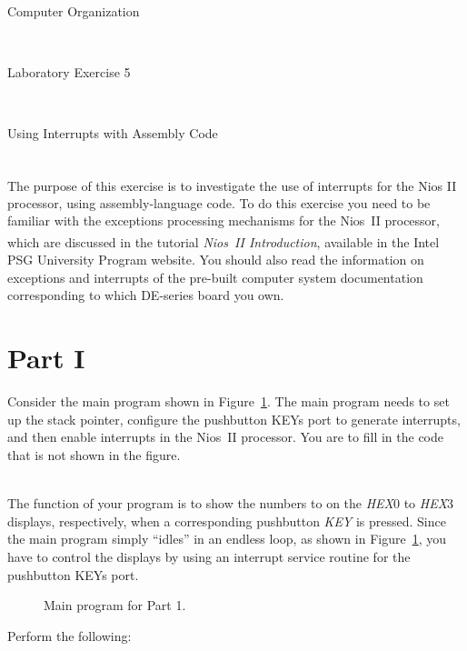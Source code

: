 \documentclass[epsfig,10pt,fullpage]{article}
\newcommand{\LabNum}{5}
\begin{document}
\centerline{\huge Computer Organization}
~\\
\centerline{\huge Laboratory Exercise \LabNum}
~\\
\centerline{\large Using Interrupts with Assembly Code}
~\\

The purpose of this exercise is to investigate the use of interrupts for the Nios\textsuperscript{\textregistered} II
processor, using assembly-language code. To do this exercise you need to be familiar with
the exceptions processing mechanisms for the Nios~II processor, which are discussed in the 
tutorial {\it Nios~II Introduction}, available in the Intel\textsuperscript{\textregistered} PSG University Program website.
You should also read the information on exceptions and interrupts of the 
pre-built computer system documentation corresponding to which DE-series board you own.

\section*{Part I}
Consider the main program shown in Figure~\ref{fig:code}.  The main program needs to set up the 
stack pointer, configure the pushbutton KEYs port to generate interrupts, and then 
enable interrupts in the Nios~II processor.  You are to fill in the code that is not shown 
in the figure.  

~\\
The function of your program is to show the numbers  to  on the {\it HEX}0
to {\it HEX}3 displays, respectively, when a corresponding pushbutton {\it KEY} is pressed. 
Since the main program simply ``idles'' in an endless loop, as
shown in Figure~\ref{fig:code}, you have to control the displays by using an 
interrupt service routine for the pushbutton KEYs port.

\begin{figure}[H]
\begin{center}

\end{center}
\caption{Main program for Part 1.}
\label{fig:code}
\end{figure}

\newpage
Perform the following:
\end{document}

